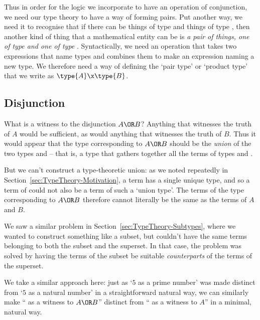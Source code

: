 Thus in order for the logic we incorporate to have an operation of conjunction, we need our type theory to have a way of forming pairs. 
Put another way, we need it to recognise that if there can be things of type  and things of type , then another kind of thing that a mathematical entity can be is \emph{a pair of things, one of type  and one of type }.  Syntactically, we need an operation that takes two expressions that name types and combines them to make an expression naming a new type.
We therefore need a way of defining the `pair type' or `product type' that we write as $\type{A}\x\type{B}$.  

\subsection{Disjunction}
\label{sec:Logic-Disjunction}

What is a witness to the disjunction $A \OR B$?  
Anything that witnesses the truth of $A$ would be sufficient, as would 
anything that witnesses the truth of $B$.  Thus it would appear that the type corresponding to $A \OR B$ should be the 
\emph{union} of the two types  and  -- that is, a type that gathers together all the terms of types  and .  

But we can't construct a type-theoretic union: as we noted repeatedly in Section~\ref{sec:TypeTheory-Motivation}, a term has a single unique type, and so a term of  could not also be a term of such a `union type'.  The terms of the type corresponding to $A \OR B$ therefore cannot literally be the same as the terms of $A$ and $B$.

We saw a similar problem in Section~\ref{sec:TypeTheory-Subtypes}, where we wanted to construct something like a subset, but couldn't have the same terms belonging to both the subset and the superset.  In that case, the problem was solved by having the terms of the subset be suitable \emph{counterparts} of the terms of the superset.  

We take a similar approach here: just as `$5$ as a prime number' was made distinct from `$5$ as a natural number' in a straightforward natural way, we can similarly make 
`` as a witness to $A \OR B$'' distinct from 
`` as a witness to $A$'' in a minimal, natural way.  

